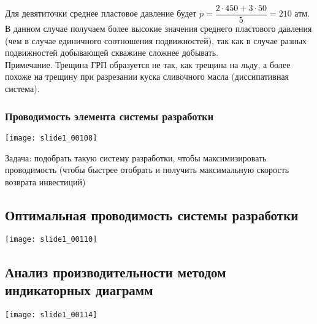 \documentclass[main.tex]{subfiles}
\begin{document}
Для девятиточки среднее пластовое давление будет $\bar{p}=\dfrac{2\cdot450+3\cdot50}{5}=210$ атм.\\

В данном случае получаем более высокие значения среднего пластового давления (чем в случае единичного соотношения подвижностей), так как в случае разных подвижностей добывающей скважине сложнее добывать.\\

Примечание. Трещина ГРП образуется не так, как трещина на льду, а более похоже на трещину при разрезании куска сливочного масла (диссипативная система).

\subsubsection{Проводимость элемента системы разработки}

\texttt{[image: slide1\_00108]}

Задача: подобрать такую систему разработки, чтобы максимизировать проводимость (чтобы быстрее отобрать и получить максимальную скорость возврата инвестиций)


\subsection{Оптимальная проводимость системы разработки}

\texttt{[image: slide1\_00110]}



\subsection{Анализ производительности методом индикаторных диаграмм}

\texttt{[image: slide1\_00114]}








\end{document}
